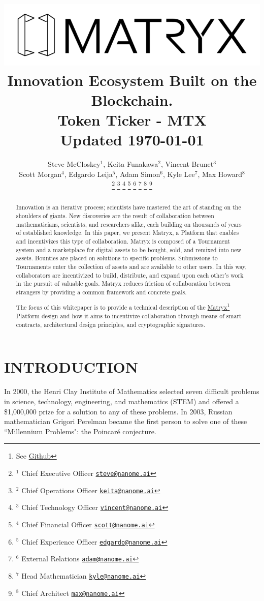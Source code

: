 \documentclass[a4paper, 10pt, conference]{ieeeconf}      %
\title{ \includegraphics[scale=.5]{logo.png}  \\
\large Innovation Ecosystem Built on the Blockchain. \\ Token Ticker - MTX \\ Updated \today
}
\author{Steve McCloskey$^{1}$, Keita Funakawa$^{2}$, Vincent Brunet$^{3}$ \\
Scott Morgan$^{4}$, Edgardo Leija$^{5}$, Adam Simon$^{6}$, Kyle Lee$^{7}$, Max Howard$^{8}$

\thanks{$^{1}$ Chief Executive Officer 
        {\tt\small \href{mailto: steve@nanome.ai}{steve@nanome.ai}}}%
\thanks{$^{2}$ Chief Operations Officer
        {\tt\small \href{mailto: keita@nanome.ai}{keita@nanome.ai}}}%
\thanks{$^{3}$ Chief Technology Officer
        {\tt\small \href{mailto: vincent@nanome.ai}{vincent@nanome.ai}}}%
\thanks{$^{4}$ Chief Financial Officer
        {\tt\small \href{mailto: scott@nanome.ai}{scott@nanome.ai}}}%
\thanks{$^{5}$ Chief Experience Officer
        {\tt\small \href{mailto: edgardo@nanome.ai}{edgardo@nanome.ai}}}%
\thanks{$^{6}$ External Relations
        {\tt\small \href{mailto: adam@nanome.ai}{adam@nanome.ai}}}%
\thanks{$^{7}$ Head Mathematician
        {\tt\small \href{mailto: kyle@nanome.ai}{kyle@nanome.ai}}}%
\thanks{$^{8}$ Chief Architect
        {\tt\small \href{mailto:
        max@nanome.ai}{max@nanome.ai}}}%
}
\begin{document}
\maketitle
\thispagestyle{empty}
\pagestyle{empty}


\begin{abstract}

Innovation is an iterative process; scientists have mastered the art of standing on the shoulders of giants. 
New discoveries are the result of collaboration between mathematicians, scientists, and researchers alike, each building on thousands of years of established knowledge. 
In this paper, we present Matryx, a Platform that enables and incentivizes this type of collaboration. 
Matryx is composed of a Tournament system and a marketplace for digital assets to be bought, sold, and remixed into new assets. 
Bounties are placed on solutions to specific problems. 
Submissions to Tournaments enter the collection of assets and are available to other users.
In this way, collaborators are incentivized to build, distribute, and expand upon each other’s work in the pursuit of valuable goals. 
Matryx reduces friction of collaboration between strangers by providing a common framework and concrete goals. 

The focus of this whitepaper is to provide a technical description of the \href{https://github.com/matryx/MatryxPlatform}{Matryx}\footnote{See \href{https://github.com/matryx/MatryxPlatform}{Github}} Platform design and how it aims to incentivize collaboration through means of smart contracts, architectural design principles, and cryptographic signatures.

\end{abstract}


\section{INTRODUCTION}\label{intro}
In 2000, the Henri Clay Institute of Mathematics selected seven difficult problems in science, technology, engineering, and mathematics (STEM) and offered a \$1,000,000 prize for a solution to any of these problems. 
In 2003, Russian mathematician Grigori Perelman became the first person to solve one of these ``Millennium Problems": the Poincaré conjecture.
\end{document}

